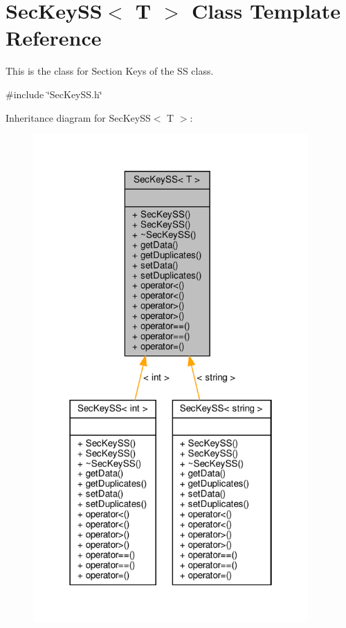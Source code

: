 \hypertarget{classSecKeySS}{}\section{Sec\+Key\+SS$<$ T $>$ Class Template Reference}
\label{classSecKeySS}


This is the class for Section Keys of the SS class.  




{\ttfamily \#include \char`\"{}Sec\+Key\+S\+S.\+h\char`\"{}}



Inheritance diagram for Sec\+Key\+SS$<$ T $>$\+:\nopagebreak
\begin{figure}[H]
\begin{center}
\leavevmode
\includegraphics[width=298pt]{classSecKeySS__inherit__graph}
\end{center}
\end{figure}


